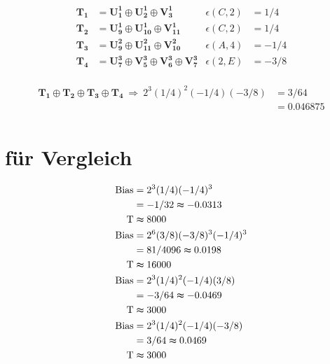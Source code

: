 \begin{equation*}
\begin{aligned}
    \mathbf{T_1} &= \mathbf{U^1_1} \oplus{} \mathbf{U^1_2} \oplus{} \mathbf{V^1_3}
    & \epsilon(C,2) &= 1/4 \\
    \mathbf{T_2} &= \mathbf{U^1_9} \oplus{} \mathbf{U^1_{10}} \oplus{} \mathbf{V^1_{11}}
    & \epsilon(C,2) &= 1/4 \\
    \mathbf{T_3} &= \mathbf{U^2_9} \oplus{} \mathbf{U^2_{11}} \oplus{} \mathbf{V^2_{10}}
    & \epsilon(A,4) &= -1/4 \\
    \mathbf{T_4} &= \mathbf{U^3_7} \oplus{} \mathbf{V^3_5} \oplus{} \mathbf{V^3_6} \oplus{} \mathbf{V^3_7}
    & \epsilon(2,E) &= -3/8 \\
\end{aligned}
\end{equation*}

\begin{equation*}
\begin{aligned}
    \mathbf{T_1} \oplus{} \mathbf{T_2} \oplus{} \mathbf{T_3} \oplus{} \mathbf{T_4} \
    \Rightarrow \ 2^3(1/4)^2(-1/4)(-3/8) &= 3/64 \\ 
    &= 0.046875\\
\end{aligned}
\end{equation*}

\section*{für Vergleich}

\begin{equation*}
\begin{aligned}
    \text{Bias} &= 2^3(1/4)(-1/4)^3 \\
    &= -1/32 \thickapprox -0.0313 \\
    \text{T} &\thickapprox 8000 \\
    \text{Bias} &= 2^6(3/8)(-3/8)^3(-1/4)^3 \\
    &= 81/4096 \thickapprox 0.0198\\
    \text{T} &\thickapprox 16000 \\
    \text{Bias} &= 2^3(1/4)^2(-1/4)(3/8) \\
    &= -3/64 \thickapprox -0.0469 \\
    \text{T} &\thickapprox 3000 \\
    \text{Bias} &= 2^3(1/4)^2(-1/4)(-3/8) \\
    &= 3/64 \thickapprox 0.0469 \\
    \text{T} &\thickapprox 3000 \\
\end{aligned}
\end{equation*}

